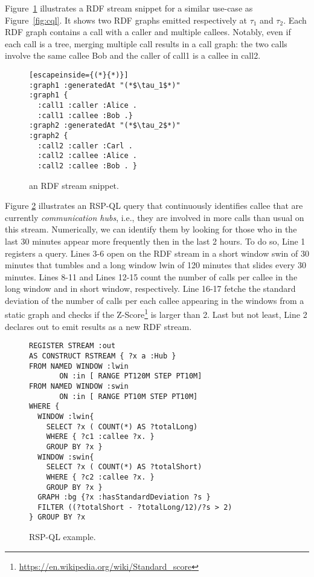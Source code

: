 Figure~\ref{fig:rdfstream} illustrates a RDF stream snippet for a similar use-case as Figure~\ref{fig:cql}. It shows two RDF graphs emitted respectively at $\tau_1$ and $\tau_2$. Each RDF graph contains a call with a caller and multiple callees. Notably, even if each call is a tree, merging multiple call results in a call graph: the two calls involve the same callee \textsf{Bob} and the caller of \textsf{call1} is a callee in  \textsf{call2}.

\begin{figure}[!h]
\begin{lstlisting}[escapeinside={(*}{*)}]
:graph1 :generatedAt "(*$\tau_1$*)"
:graph1 { 
  :call1 :caller :Alice .
  :call1 :callee :Bob .}
:graph2 :generatedAt "(*$\tau_2$*)" 
:graph2 { 
  :call2 :caller :Carl .
  :call2 :callee :Alice .
  :call2 :callee :Bob . }  
\end{lstlisting}
\vspace*{-4mm}
\caption{\label{fig:rdfstream}an RDF stream snippet.}
\end{figure}

Figure \ref{fig:rspql} illustrates an RSP-QL query that continuously identifies callee that are currently \textit{communication hubs}, i.e., they are involved in more calls than usual on this stream. Numerically, we can identify them by looking for those who in the last 30 minutes appear more frequently then in the last 2 hours. To do so, Line 1 registers a query. Lines 3-6 open on the RDF stream \textsf{in} a short window \textsf{swin} of 30 minutes that tumbles and a long window \textsf{lwin} of 120 minutes that slides every 30 minutes. Lines 8-11 and Lines 12-15 count the number of calls per callee in the long window and in short window, respectively. Line 16-17 fetche the standard deviation of the number of calls per each callee appearing in the windows from a static graph and checks if the Z-Score\footnote{\url{https://en.wikipedia.org/wiki/Standard_score}} is larger than 2. Last but not least, Line 2 declares out to emit results as a new RDF stream.

\begin{figure}[!h]
\begin{lstlisting}[language=rsp-ql]
REGISTER STREAM :out
AS CONSTRUCT RSTREAM { ?x a :Hub }
FROM NAMED WINDOW :lwin 
       ON :in [ RANGE PT120M STEP PT10M]
FROM NAMED WINDOW :swin 
       ON :in [ RANGE PT10M STEP PT10M]
WHERE { 
  WINDOW :lwin{
    SELECT ?x ( COUNT(*) AS ?totalLong)
    WHERE { ?c1 :callee ?x. }
    GROUP BY ?x }
  WINDOW :swin{
    SELECT ?x ( COUNT(*) AS ?totalShort)
    WHERE { ?c2 :callee ?x. }
    GROUP BY ?x }
  GRAPH :bg {?x :hasStandardDeviation ?s }
  FILTER ((?totalShort - ?totalLong/12)/?s > 2)
} GROUP BY ?x
\end{lstlisting}
\vspace*{-4mm}
\caption{\label{fig:rspql}RSP-QL example.}
\end{figure}

